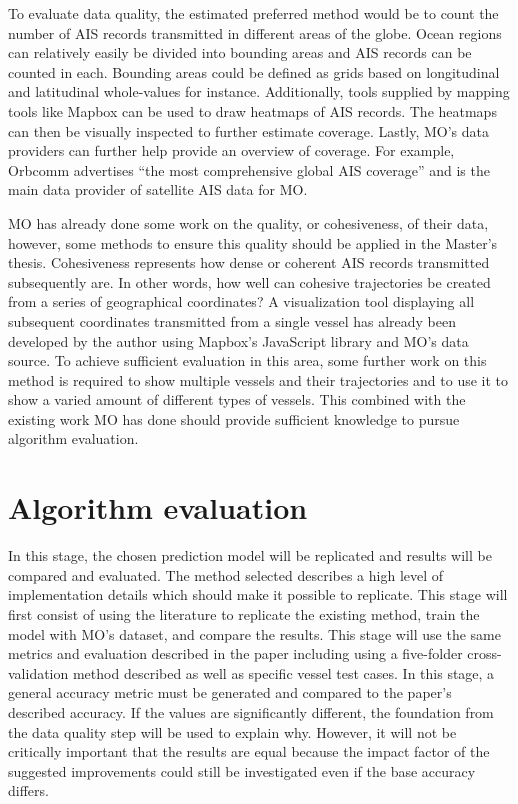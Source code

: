 To evaluate data quality, the estimated preferred method would be to count the number of AIS records transmitted in different areas of the globe. Ocean regions can relatively easily be divided into bounding areas and AIS records can be counted in each. Bounding areas could be defined as grids based on longitudinal and latitudinal whole-values for instance. Additionally, tools supplied by mapping tools like Mapbox \parencite{mapbox:online} can be used to draw heatmaps of AIS records. The heatmaps can then be visually inspected to further estimate coverage. Lastly, MO’s data providers can further help provide an overview of coverage. For example, Orbcomm \parencite{AISData_orbcom:online} advertises “the most comprehensive global AIS coverage” and is the main data provider of satellite AIS data for MO.

MO has already done some work on the quality, or cohesiveness, of their data, however, some methods to ensure this quality should be applied in the Master’s thesis. Cohesiveness represents how dense or coherent AIS records transmitted subsequently are. In other words, how well can cohesive trajectories be created from a series of geographical coordinates? A visualization tool displaying all subsequent coordinates transmitted from a single vessel has already been developed by the author using Mapbox’s JavaScript library and MO’s data source. To achieve sufficient evaluation in this area, some further work on this method is required to show multiple vessels and their trajectories and to use it to show a varied amount of different types of vessels. This combined with the existing work MO has done should provide sufficient knowledge to pursue algorithm evaluation.


\section{Algorithm evaluation}

In this stage, the chosen prediction model will be replicated and results will be compared and evaluated. The method selected describes a high level of implementation details which should make it possible to replicate. This stage will first consist of using the literature to replicate the existing method, train the model with MO’s dataset, and compare the results. This stage will use the same metrics and evaluation described in the paper including using a five-folder cross-validation method described as well as specific vessel test cases. In this stage, a general accuracy metric must be generated and compared to the paper’s described accuracy. If the values are significantly different, the foundation from the data quality step will be used to explain why. However, it will not be critically important that the results are equal because the impact factor of the suggested improvements could still be investigated even if the base accuracy differs.

